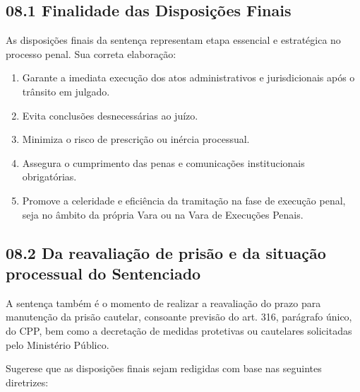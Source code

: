 \documentclass[letterpaper,10pt,brazil]{sphinxmanual}
\begin{document}
\subsection{08.1 \textendash{} Finalidade das Disposições Finais}
\label{\detokenize{08sentenca_disposicoesfinais:finalidade-das-disposicoes-finais}}
\sphinxAtStartPar
As disposições finais da sentença representam etapa essencial e estratégica no processo penal. Sua correta elaboração:
\begin{enumerate}
%
\item {} 
\sphinxAtStartPar
Garante a imediata execução dos atos administrativos e jurisdicionais após o trânsito em julgado.

\item {} 
\sphinxAtStartPar
Evita conclusões desnecessárias ao juízo.

\item {} 
\sphinxAtStartPar
Minimiza o risco de prescrição ou inércia processual.

\item {} 
\sphinxAtStartPar
Assegura o cumprimento das penas e comunicações institucionais obrigatórias.

\item {} 
\sphinxAtStartPar
Promove a celeridade e eficiência da tramitação na fase de execução penal, seja no âmbito da própria Vara ou na Vara de Execuções Penais.

\end{enumerate}


\subsection{08.2 \textendash{} Da reavaliação de prisão e da situação processual do Sentenciado}
\label{\detokenize{08sentenca_disposicoesfinais:da-reavaliacao-de-prisao-e-da-situacao-processual-do-sentenciado}}
\sphinxAtStartPar
A sentença também é o momento de realizar a reavaliação do prazo  para manutenção da prisão cautelar, consoante previsão do art. 316, parágrafo único, do CPP, bem como a decretação de medidas protetivas ou cautelares solicitadas pelo Ministério Público.

\sphinxAtStartPar
Sugere\sphinxhyphen{}se que as disposições finais sejam redigidas com base nas seguintes diretrizes:
\end{document}
